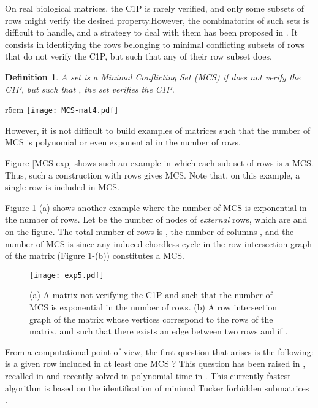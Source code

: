 \documentclass{article}
\newtheorem{definition}{Definition}
\begin{document}
On real biological matrices, the C1P is rarely verified, and only some
subsets of rows might verify the desired property.However, the combinatorics of such sets is difficult to
handle, and a strategy to deal with them has been proposed
in \cite{BBCC2004,Chauve08,SW2009}. It consists in identifying
the rows belonging to minimal conflicting subsets of rows that 
do not verify the C1P, but such that any of their
row subset does. 

\begin{definition}
A set  is a {\em Minimal
  Conflicting Set} (MCS) if  does not verify the C1P, but such 
that , the set  verifies the C1P.
\end{definition}






\begin{wrapfigure}[15]{r}{5cm}
  \centering
\texttt{[image: MCS-mat4.pdf]}
\caption{A matrix not verifying the C1P and such
  that each set of 3 rows is a MCS.}
 \label{MCS-exp}
\end{wrapfigure}

\noindent
However, it is not difficult to build examples of  matrices such that the
number of MCS is polynomial or even exponential in the number of
rows.

 Figure \ref{MCS-exp} shows such an example in which each sub set of
 rows is a MCS. Thus, such a construction with  rows
gives   MCS. Note that, on this example, a single
row is included in  MCS.



 Figure \ref{MCS-exp2}-(a) shows another example where the number of MCS
 is exponential in the number of rows. Let  be the number of nodes
 of {\em external} rows, which are  and  on the
 figure. The total number of rows is , the number of columns ,
 and the number of MCS is  since any induced chordless cycle in
 the row intersection graph of the matrix  (Figure \ref{MCS-exp2}-(b)) 
constitutes a MCS.

\begin{figure}[htb]
  \centering
\texttt{[image: exp5.pdf]}
\caption{(a) A matrix not verifying the C1P and such that the number 
of MCS is exponential in the  number of rows. (b) A row intersection
graph of the matrix whose vertices correspond to the rows of the matrix,
and such that there exists an edge between two rows  and  
if .}
 \label{MCS-exp2}
\end{figure}


From a computational point of view, the first question that arises is the
following: is a given row  included in at least one MCS ? 
This question has been raised in \cite{BBCC2004}, recalled in 
\cite{CHSY2009,Chauve08} and recently solved in polynomial time
 in \cite{Blin2011}. This currently fastest 
algorithm is based on the identification of minimal Tucker forbidden 
submatrices \cite{T1972,D2009}.
\end{document}
